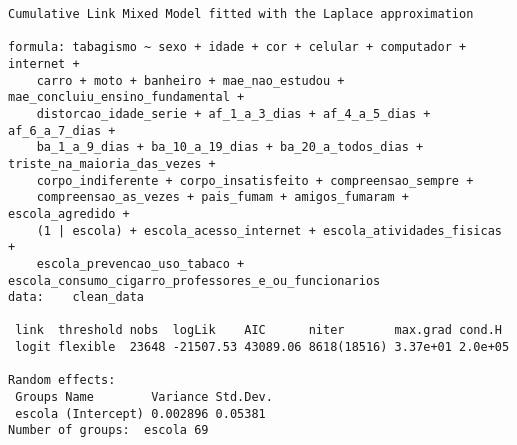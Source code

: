 \documentclass[
]{article}
\begin{document}
\begin{verbatim}
Cumulative Link Mixed Model fitted with the Laplace approximation

formula: tabagismo ~ sexo + idade + cor + celular + computador + internet +  
    carro + moto + banheiro + mae_nao_estudou + mae_concluiu_ensino_fundamental +  
    distorcao_idade_serie + af_1_a_3_dias + af_4_a_5_dias + af_6_a_7_dias +  
    ba_1_a_9_dias + ba_10_a_19_dias + ba_20_a_todos_dias + triste_na_maioria_das_vezes +  
    corpo_indiferente + corpo_insatisfeito + compreensao_sempre +  
    compreensao_as_vezes + pais_fumam + amigos_fumaram + escola_agredido +  
    (1 | escola) + escola_acesso_internet + escola_atividades_fisicas +  
    escola_prevencao_uso_tabaco + escola_consumo_cigarro_professores_e_ou_funcionarios
data:    clean_data

 link  threshold nobs  logLik    AIC      niter       max.grad cond.H 
 logit flexible  23648 -21507.53 43089.06 8618(18516) 3.37e+01 2.0e+05

Random effects:
 Groups Name        Variance Std.Dev.
 escola (Intercept) 0.002896 0.05381 
Number of groups:  escola 69 


\end{verbatim}
\end{document}
